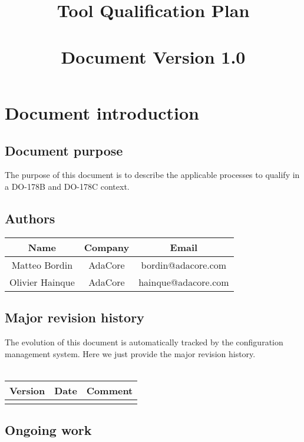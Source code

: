 \documentclass {report}
\begin{document}
\title{\huge
  \xcov{}\\
  Tool Qualification Plan\\ \ \\
  \large \textbf{Document Version 1.0}}

\maketitle
\tableofcontents

\chapter{Document introduction}

\section{Document purpose}
The purpose of this document is to describe the applicable processes to
qualify \xcov{} in a DO-178B and DO-178C context.

\section{Authors}
\begin{tabular}{|c|c|c|}
\hline
\textbf{Name} & \textbf{Company} & \textbf{Email} \\ \hline
Matteo Bordin & AdaCore & bordin@adacore.com \\ \hline
Olivier Hainque & AdaCore & hainque@adacore.com \\ \hline
\end{tabular}

\section{Major revision history}

The evolution of this document is automatically tracked by the configuration
management system. Here we just provide the major revision history.  \ \\ \\
\begin{tabular}{|c|c|c|}
\hline
\textbf{Version} & \textbf{Date} & \textbf{Comment} \\ \hline
 &  &  \\ \hline
\end{tabular}

\section{Ongoing work}
\end{document}
